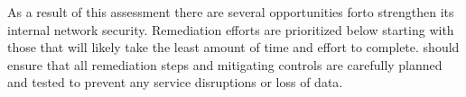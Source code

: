 \qquad As a result of this assessment there are several opportunities for\enterpriseName to strengthen its internal network security.
Remediation efforts are prioritized below starting with those that will likely take the least amount of time and effort to
complete. \enterpriseName should ensure that all remediation steps and mitigating controls are carefully planned and tested
to prevent any service disruptions or loss of data. 